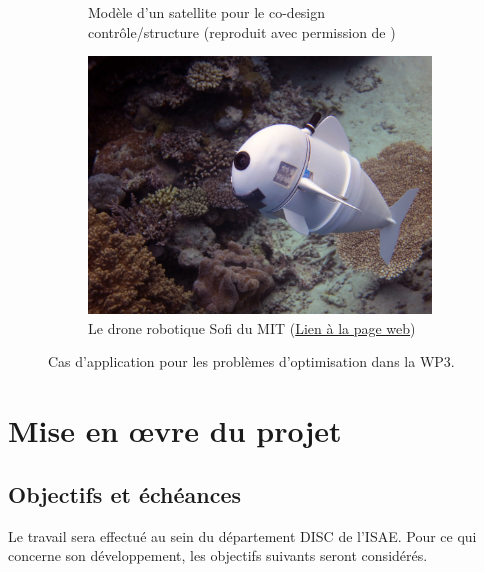 \documentclass[12pt, french]{article}
\begin{document}
\begin{figure}[t]
\begin{subfigure}[t]{0.3\textwidth}
		\caption{Modèle d'un satellite pour le co-design contrôle/structure (reproduit avec permission de \cite{finozzi2022sub})}
		\label{fig:codesign_sat}
	\end{subfigure}\hfill
	\begin{subfigure}[t]{0.35\textwidth}
		\includegraphics[width=\columnwidth]{Sofi_MIT.jpeg}%
		\caption{Le drone robotique Sofi du MIT (\href{https://www.csail.mit.edu/research/sofi-soft-robotic-fish}{Lien à la page web})}
		\label{fig:sofi-mit}
	\end{subfigure}
	\caption[]{Cas d'application pour les problèmes d'optimisation dans la WP3.}%
	\label{fig:optmisation}%
\end{figure}


\section{Mise en \oe{}vre du projet}

\subsection{Objectifs et échéances}

Le travail sera effectué au sein du département DISC de l'ISAE. Pour ce qui concerne son développement, les objectifs suivants seront considérés.
\end{document}
